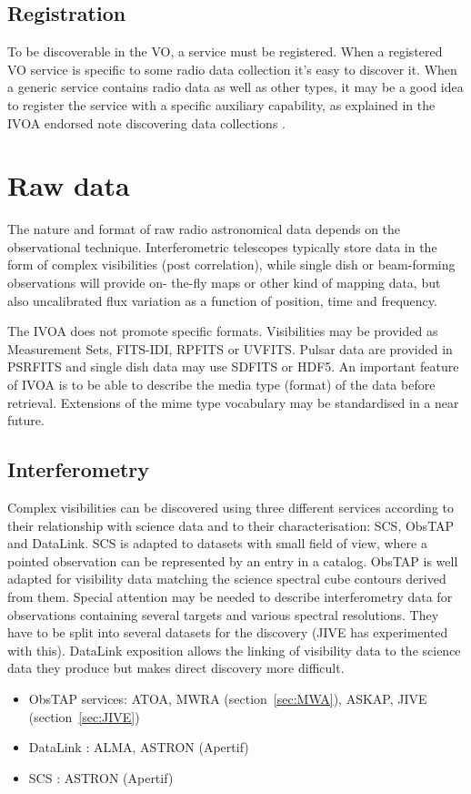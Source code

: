 \documentclass[11pt,a4paper]{ivoa}
\begin{document}
\subsection{Registration} 
To be discoverable in the VO, a service must be registered. When a registered VO service is specific to 
some radio data collection it's easy to discover it. When a generic service contains radio data as well 
as other types, it may be a good idea to register the service with a specific auxiliary capability, as 
explained in the IVOA endorsed note discovering data collections \citep{2019ivoa.rept.0520D}.

\section{Raw data}
The nature and format of raw radio astronomical data 
depends on the observational technique. Interferometric telescopes typically store data in the form of 
complex visibilities (post correlation), while single dish or beam-forming observations will provide on-
the-fly maps or other kind of mapping data, but also uncalibrated flux variation as a function of 
position, time and frequency. 

The IVOA does not promote specific formats. Visibilities may be provided as Measurement Sets, FITS-IDI, 
RPFITS or UVFITS. Pulsar data are provided in PSRFITS and single dish data may use SDFITS or HDF5. An 
important feature of IVOA is to be able to describe the media type (format) of the data before 
retrieval. Extensions of the mime type vocabulary may be standardised in a near future.  

\subsection{Interferometry}
Complex visibilities can be discovered using three different services according to their relationship 
with science data and to their characterisation: SCS, ObsTAP and DataLink. SCS is adapted to datasets 
with small field of view, where a pointed observation can be
represented by an entry in a catalog. ObsTAP is well adapted for visibility data matching the science 
spectral cube contours derived from them. Special attention may be needed to describe interferometry 
data for observations containing several targets and various spectral resolutions. They have to be split 
into several datasets for the discovery (JIVE has experimented with this). DataLink exposition allows 
the linking of visibility data to the science data they produce but makes direct discovery more 
difficult. 
\begin{itemize}
\item ObsTAP services: ATOA, MWRA (section~\ref{sec:MWA}), ASKAP, JIVE (section~\ref{sec:JIVE})
\item DataLink : ALMA, ASTRON (Apertif)
\item SCS : ASTRON (Apertif)
\end{itemize}
\end{document}
